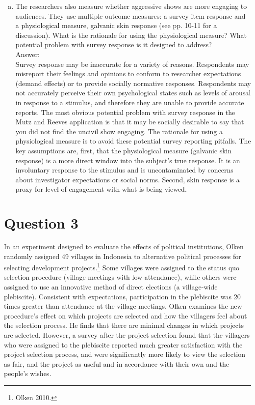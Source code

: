 \documentclass[11pt,notitlepage]{article}\usepackage[]{graphicx}\usepackage[]{color}
\begin{document}
\begin{enumerate}[a)]
\item The researchers also measure whether aggressive shows are more engaging to audiences. They use multiple outcome measures: a survey item response and a physiological measure, galvanic skin response (see pp. 10-11 for a discussion). What is the rationale for using the physiological measure? What potential problem with survey response is it designed to address?\\
Answer:\\
Survey response may be inaccurate for a variety of reasons. Respondents may misreport their feelings and opinions to conform to researcher expectations (demand effects) or to provide socially normative responses. Respondents may not accurately perceive their own psychological states such as levels of arousal in response to a stimulus, and therefore they are unable to provide accurate reports.  The most obvious potential problem with survey response in the Mutz and Reeves application is that it may be socially desirable to say that you did not find the uncivil show engaging. The rationale for using a physiological measure is to avoid these potential survey reporting pitfalls. The key assumptions are, first, that the physiological measure (galvanic skin response) is a more direct window into the subject's true response. It is an involuntary response to the stimulus and is uncontaminated by concerns about investigator expectations or social norms. Second, skin response is a proxy for level of engagement with what is being viewed. 
\end{enumerate}

\section*{Question 3}
In an experiment designed to evaluate the effects of political institutions, Olken randomly assigned 49 villages in Indonesia to alternative political processes for selecting development projects.\footnote{Olken 2010.} Some villages were assigned to the status quo selection procedure (village meetings with low attendance), while others were assigned to use an innovative method of direct elections (a village-wide plebiscite). Consistent with expectations, participation in the plebiscite was 20 times greater than attendance at the village meetings. Olken examines the new procedure's effect on which projects are selected and how the villagers feel about the selection process. He finds that there are minimal changes in which projects are selected. However, a survey after the project selection found that the villagers who were assigned to the plebiscite reported much greater satisfaction with the project selection process, and were significantly more likely to view the selection as fair, and the project as useful and in accordance with their own and the people's wishes.
\end{document}
